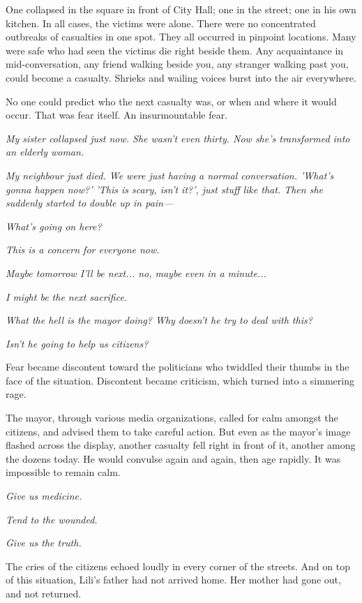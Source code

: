 One collapsed in the square in front of City Hall; one in the street;
one in his own kitchen. In all cases, the victims were alone. There were
no concentrated outbreaks of casualties in one spot. They all occurred
in pinpoint locations. Many were safe who had seen the victims die right
beside them. Any acquaintance in mid-conversation, any friend walking
beside you, any stranger walking past you, could become a casualty.
Shrieks and wailing voices burst into the air everywhere.

No one could predict who the next casualty was, or when and where it
would occur. That was fear itself. An insurmountable fear.

\emph{My sister collapsed just now. She wasn't even thirty. Now she's
transformed into an elderly woman.}

\emph{My neighbour just died. We were just having a normal conversation.
'What's gonna happen now?' 'This is scary, isn't it?', just stuff like
that. Then she suddenly started to double up in pain---}

\emph{What's going on here?}

\emph{This is a concern for everyone now.}

\emph{Maybe tomorrow I'll be next... no, maybe even in a minute...}

\emph{I might be the next sacrifice.}

\emph{What the hell is the mayor doing? Why doesn't he try to deal with this?}

\emph{Isn't he going to help us citizens?}

Fear became discontent toward the politicians who twiddled their thumbs
in the face of the situation. Discontent became criticism, which turned
into a simmering rage.

The mayor, through various media organizations, called for calm amongst
the citizens, and advised them to take careful action. But even as the
mayor's image flashed across the display, another casualty fell right in
front of it, another among the dozens today. He would convulse again and
again, then age rapidly. It was impossible to remain calm.

\emph{Give us medicine.}

\emph{Tend to the wounded.}

\emph{Give us the truth.}

The cries of the citizens echoed loudly in every corner of the streets.
And on top of this situation, Lili's father had not arrived home. Her
mother had gone out, and not returned.

